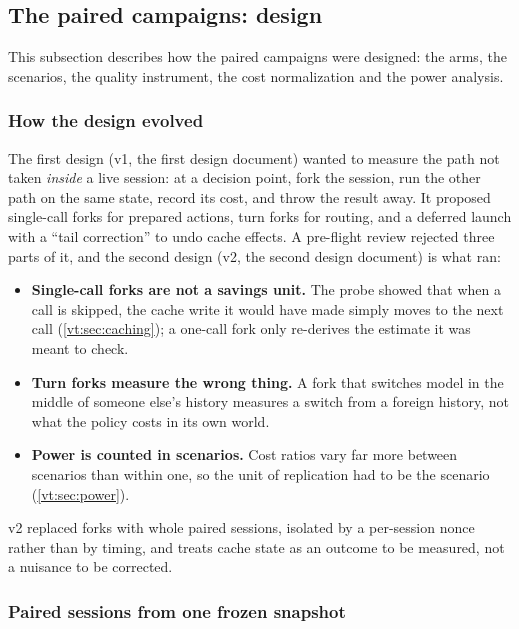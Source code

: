 \subsection{The paired campaigns: design}\label{vt:sec:design}

This subsection describes how the paired campaigns were designed: the arms, the scenarios, the quality instrument,
the cost normalization and the power analysis.

\subsubsection{How the design evolved}\label{vt:sec:evolution}

The first design (v1, the first design document) wanted to measure the path not taken
\emph{inside} a live session: at a decision point, fork the session, run the other path on the same state, record
its cost, and throw the result away. It proposed single-call forks for prepared actions, turn forks for routing,
and a deferred launch with a ``tail correction'' to undo cache effects. A pre-flight review rejected three parts
of it, and the second design (v2, the second design document) is what ran:
\begin{itemize}
  \item \textbf{Single-call forks are not a savings unit.} The probe showed that when a call is skipped, the cache
    write it would have made simply moves to the next call (\cref{vt:sec:caching}); a one-call fork only re-derives
    the estimate it was meant to check.
  \item \textbf{Turn forks measure the wrong thing.} A fork that switches model in the middle of someone else's
    history measures a switch from a foreign history, not what the policy costs in its own world.
  \item \textbf{Power is counted in scenarios.} Cost ratios vary far more between scenarios than within one, so
    the unit of replication had to be the scenario (\cref{vt:sec:power}).
\end{itemize}
v2 replaced forks with whole paired sessions, isolated by a per-session nonce rather than by timing, and treats
cache state as an outcome to be measured, not a nuisance to be corrected.

\subsubsection{Paired sessions from one frozen snapshot}

